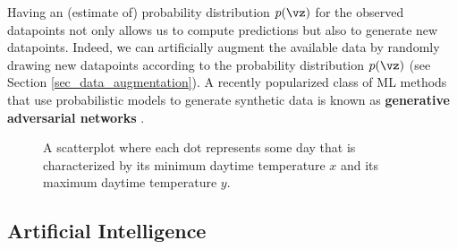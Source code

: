 \documentclass[12pt]{report}
\newcommand{\boundellipse}[3]%
{(#1) ellipse (#2 and #3)
}
\begin{document}
Having an (estimate of) probability distribution $p(\vz)$ for the observed 
datapoints not only allows us to compute predictions but also to generate 
new datapoints. Indeed, we can artificially augment the available data  
by randomly drawing new datapoints according to the probability distribution $p(\vz)$ 
(see Section \ref{sec_data_augmentation}). A recently popularized class of 
ML methods that use probabilistic models to generate synthetic data  
is known as {\bf generative adversarial networks} \cite{GoodfellowGAN}. 



\begin{figure}[htbp]
	\begin{center}
		\vspace*{-14mm}
	\end{center}
	\caption{A scatterplot where each dot represents some day that is characterized 
		by its minimum daytime temperature $x$ and its maximum daytime temperature $y$.}
	\label{fig_scatterplot_temp_FMI_stat_model}
	\vspace*{-3mm}
\end{figure}




\subsection{Artificial Intelligence}
\end{document}
